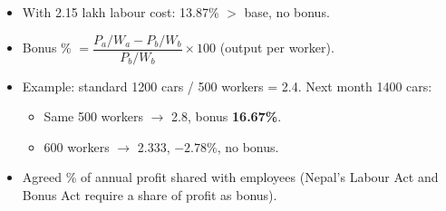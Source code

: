 {\begin{itemize}
    $\rightarrow$ bonus \textbf{14.07\%}.
  \item With 2.15 lakh labour cost: 13.87\% $>$ base, no bonus.
\end{itemize}
\begin{itemize}
  \item Bonus \% $= \dfrac{P_a/W_a - P_b/W_b}{P_b/W_b} \times 100$ (output per worker).
  \item Example: standard 1200 cars / 500 workers = 2.4. Next month 1400 cars:
  \begin{itemize}
    \item Same 500 workers $\rightarrow$ 2.8, bonus \textbf{16.67\%}.
    \item 600 workers $\rightarrow$ 2.333, $-2.78\%$, no bonus.
  \end{itemize}
\end{itemize}
\begin{itemize}
  \item Agreed \% of annual profit shared with employees (Nepal's Labour Act and Bonus Act
    require a share of profit as bonus).
\end{itemize}}

\vspace{2pt}


